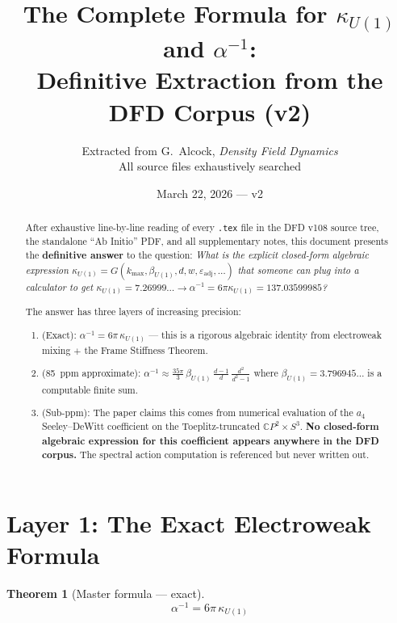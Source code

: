 \documentclass[12pt,a4paper]{article}
\title{The Complete Formula for $\kappa_{U(1)}$ and $\alpha^{-1}$:\\
Definitive Extraction from the DFD Corpus (v2)}
\author{Extracted from G.\ Alcock, \textit{Density Field Dynamics}\\
All source files exhaustively searched}
\date{March 22, 2026 --- v2}
\newtheorem{theorem}{Theorem}
\theoremstyle{definition}
\begin{document}
\maketitle

\begin{abstract}
After exhaustive line-by-line reading of every \texttt{.tex} file in the
DFD v108 source tree, the standalone ``Ab Initio'' PDF, and all
supplementary notes, this document presents the \textbf{definitive answer}
to the question: \emph{What is the explicit closed-form algebraic expression
$\kappa_{U(1)} = G(k_{\max}, \beta_{U(1)}, d, w, \varepsilon_{\mathrm{adj}}, \ldots)$
that someone can plug into a calculator to get
$\kappa_{U(1)} = 7.26999\ldots \to \alpha^{-1} = 6\pi\kappa_{U(1)} = 137.03599985$?}

The answer has three layers of increasing precision:
\begin{enumerate}
\item[\textbf{Layer 1}] (Exact): $\alpha^{-1} = 6\pi\,\kappa_{U(1)}$ ---
  this is a rigorous algebraic identity from electroweak mixing $+$
  the Frame Stiffness Theorem.
\item[\textbf{Layer 2}] (85~ppm approximate):
  $\alpha^{-1} \approx \frac{35\pi}{3}\,\beta_{U(1)}\,
  \frac{d-1}{d}\,\frac{d^2}{d^2-1}$
  where $\beta_{U(1)} = 3.796945\ldots$ is a computable finite sum.
\item[\textbf{Layer 3}] (Sub-ppm): The paper claims this comes from
  numerical evaluation of the $a_4$ Seeley--DeWitt coefficient on the
  Toeplitz-truncated $\mathbb{C}P^2 \times S^3$.  \textbf{No closed-form
  algebraic expression for this coefficient appears anywhere in the
  DFD corpus.}  The spectral action computation is referenced but
  never written out.
\end{enumerate}
\end{abstract}

\tableofcontents
\newpage

\section{Layer 1: The Exact Electroweak Formula}
\label{sec:layer1}

\begin{theorem}[Master formula --- exact]
\label{thm:master}
\begin{equation}
\boxed{\alpha^{-1} = 6\pi\,\kappa_{U(1)}}
\end{equation}
\end{theorem}
\end{document}
